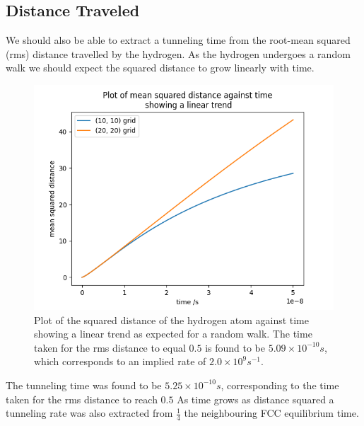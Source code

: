\subsection{Distance Traveled}
We should also be able to
extract a tunneling time from
the root-mean squared (rms)
distance travelled by the
hydrogen. As the hydrogen
undergoes a random walk we should
expect the squared distance to
grow linearly with time.
\begin{figure}
    \centering
    \includegraphics[width=0.5\linewidth]{Figures/Redfield/Plot of lindblad solution squared distance.png}
    \caption{Plot of the squared distance
    of the hydrogen atom against time
    showing a linear trend as expected
    for a random walk. The time taken
    for the rms distance to equal \(0.5\)
    is found to be
    \(5.09\times{}10^{-10}s\),
    which corresponds to an implied rate
    of \(2.0 \times 10^{9}s^{-1}\).
    }
\end{figure}
The tunneling time was
found to be \(5.25\times{}10^{-10}s\),
corresponding to the time taken
for the rms distance to
reach \(0.5\)
As time grows as distance squared
a tunneling rate was also
extracted from
\(\frac{1}{4}\) the
neighbouring FCC equilibrium
time.


